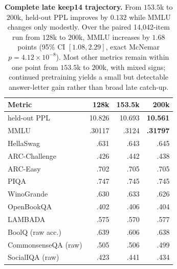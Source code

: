 \begin{table}[t]
\centering
\small
\setlength{\tabcolsep}{4pt}
\begin{tabular}{@{}lrrr@{}}
\toprule
\textbf{Metric} & \textbf{128k} & \textbf{153.5k} & \textbf{200k} \\
\midrule
held-out PPL & 10.826 & 10.693 & \textbf{10.561} \\
MMLU & .30117 & .3124 & \textbf{.31797} \\
HellaSwag & .631 & .643 & .645 \\
ARC-Challenge & .426 & .442 & .438 \\
ARC-Easy & .702 & .705 & .705 \\
PIQA & .747 & .745 & .745 \\
WinoGrande & .630 & .633 & .626 \\
OpenBookQA & .402 & .406 & .404 \\
LAMBADA & .575 & .570 & .577 \\
BoolQ (raw acc.) & .639 & .606 & .638 \\
CommonsenseQA (raw) & .505 & .506 & .499 \\
SocialIQA (raw) & .423 & .441 & .434 \\
\bottomrule
\end{tabular}
\caption{\textbf{Complete late keep14 trajectory.}
From $153.5$k to $200$k, held-out PPL improves by $0.132$ while MMLU changes
only modestly. Over the paired 14,042-item run from $128$k to $200$k, MMLU
increases by $1.68$ points (95\% CI $[1.08,2.29]$, exact McNemar
$p=4.12\times10^{-8}$). Most other metrics remain within one point from
$153.5$k to $200$k, with mixed signs; continued pretraining yields a small but
detectable answer-letter gain rather than broad late catch-up.}
\label{tab:app-postapex}
\end{table}
